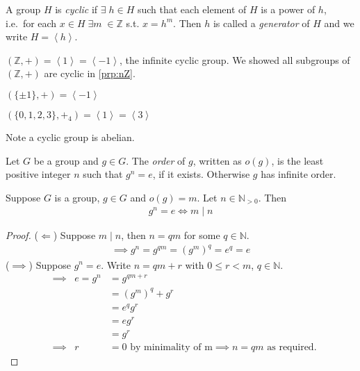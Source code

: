 \begin{definition}
A group \(H\) is \emph{cyclic} if \(\exists \; h \in H\) such that each element of \(H\) is a power of \(h\), i.e.~for each \(x \in H \; \exists m \; \in \mathbb{Z}\) s.t. \(x = h^m\).
Then \(h\) is called a \emph{generator} of \(H\) and we write \(H = \left\langle h \right\rangle\).
\end{definition}

\begin{example}
\((\mathbb{Z}, +) = \left\langle 1 \right\rangle = \left\langle -1 \right\rangle\), the infinite cyclic group.
We showed all subgroups of \((\mathbb{Z}, +)\) are cyclic in \ref{prp:nZ}.
\end{example}

\begin{example}
\((\{ \pm 1 \}, +) = \left\langle -1 \right\rangle\)
\end{example}

\begin{example}
\((\{ 0, 1, 2, 3\}, +_4) = \left\langle 1 \right\rangle = \left\langle 3 \right\rangle\)
\end{example}

Note a cyclic group is abelian.

\begin{definition}
Let \(G\) be a group and \(g \in G\). The \emph{order} of \(g\), written as \(o(g)\), is the least positive integer \(n\) such that \(g^n = e\), if it exists. Otherwise \(g\) has infinite order.
\end{definition}

\begin{lemma}
\protect\hypertarget{lem:five}{}\label{lem:five}Suppose \(G\) is a group, \(g \in G\) and \(o(g) = m\). Let \(n \in \mathbb{N}_{>0}\). Then
\begin{align*}
    g^n = e \iff m \mid n
\end{align*}
\end{lemma}

\begin{proof}
(\(\Longleftarrow\)) Suppose \(m \mid n\), then \(n = qm\) for some \(q \in \mathbb{N}\).
\begin{align*}
    \implies g^n = g^{qm} = (g^m)^q = e^q = e
\end{align*}
(\(\implies\)) Suppose \(g^n = e\). Write \(n = qm + r\) with \(0 \leq r < m\), \(q \in \mathbb{N}\).
\begin{align*}
    &\implies & e = g^n &= g^{qm + r} \\
    && &= (g^m)^q + g^r \\
    && &= e^q g^r \\
    && &= e g^r \\
    && &= g^r \\
    &\implies & r &= 0 \text{ by minimality of m} \implies n = qm \text{ as required.} 
\end{align*}
\end{proof}


